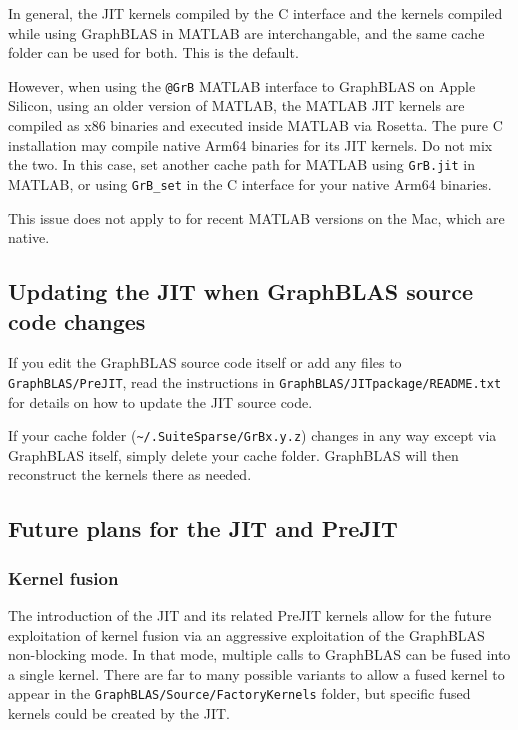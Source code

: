 In general, the JIT kernels compiled by the C interface and the kernels
compiled while using GraphBLAS in MATLAB are interchangable, and the same cache
folder can be used for both.  This is the default.

However, when using the \verb'@GrB' MATLAB interface to GraphBLAS on Apple
Silicon, using an older version of MATLAB, the MATLAB JIT kernels are compiled
as x86 binaries and executed inside MATLAB via Rosetta.  The pure C
installation may compile native Arm64 binaries for its JIT kernels.  Do not mix
the two.  In this case, set another cache path for MATLAB using \verb'GrB.jit'
in MATLAB, or using \verb'GrB_set' in the C interface for your native Arm64
binaries.

This issue does not apply to for recent MATLAB versions on the Mac,
which are native.

\subsection{Updating the JIT when GraphBLAS source code changes}

If you edit the GraphBLAS source code itself or add any files to
\verb'GraphBLAS/PreJIT', read the instructions in
\verb'GraphBLAS/JITpackage/README.txt' for details on how to update the JIT
source code.

If your cache folder (\verb'~/.SuiteSparse/GrBx.y.z') changes in any way
except via GraphBLAS itself, simply delete your cache folder.  GraphBLAS will
then reconstruct the kernels there as needed.

\subsection{Future plans for the {\sf JIT} and {\sf PreJIT}}
\label{jit_future}

\subsubsection{Kernel fusion}
The introduction of the JIT and its related PreJIT kernels allow for the future
exploitation of kernel fusion via an aggressive exploitation of the GraphBLAS
non-blocking mode.  In that mode, multiple calls to GraphBLAS can be fused into
a single kernel.  There are far to many possible variants to allow a fused
kernel to appear in the \verb'GraphBLAS/Source/FactoryKernels' folder, but
specific fused kernels could be created by the JIT.

